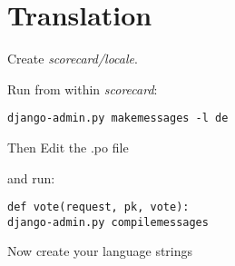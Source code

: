 \section{Translation}

Create \emph{scorecard/locale}.

Run from within \emph{scorecard}:

\begin{lstlisting}[style=Bash, caption=webtech/config.py, label=lst:config.py1]
django-admin.py makemessages -l de
\end{lstlisting}

Then Edit the .po file


and run:
\begin{lstlisting}[style=Bash, caption=Add messages to views, label=lst:views_msg]def vote(request, pk, vote):
django-admin.py compilemessages
\end{lstlisting}

Now create your language strings